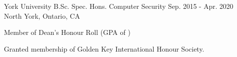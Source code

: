 

\begin{cventries}

  \cventry
    {York University} %
    {B.Sc. Spec. Hons. Computer Security} %
    {Sep. 2015 - Apr. 2020} %
    {North York, Ontario, CA} %
    {
      \begin{cvitems} %
        \item {Member of Dean's Honour Roll (GPA of )}
        \item {Granted membership of Golden Key International Honour Society.}
        \item {}
      \end{cvitems} 
    }

\end{cventries}
